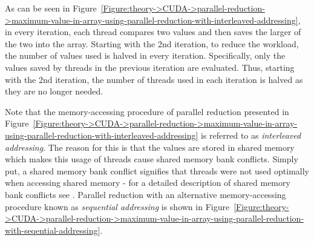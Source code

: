 As can be seen in Figure~\ref{Figure:theory->CUDA->parallel-reduction->maximum-value-in-array-using-parallel-reduction-with-interleaved-addressing}, in every iteration, each thread compares two values and then saves the larger of the two into the array.
Starting with the 2nd iteration, to reduce the workload, the number of values used is halved in every iteration.
Specifically, only the values saved by threads in the previous iteration are evaluated.
Thus, starting with the 2nd iteration, the number of threads used in each iteration is halved as they are no longer needed.

Note that the memory-accessing procedure of parallel reduction presented in Figure~\ref{Figure:theory->CUDA->parallel-reduction->maximum-value-in-array-using-parallel-reduction-with-interleaved-addressing} is referred to as \textit{interleaved addressing}.
The reason for this is that the values are stored in shared memory which makes this usage of threads cause shared memory bank conflicts.
Simply put, a shared memory bank conflict signifies that threads were not used optimally when accessing shared memory - for a detailed description of shared memory bank conflicts see  \cite{Cejka2022}.
Parallel reduction with an alternative memory-accessing procedure known as \textit{sequential addressing} is shown in Figure~\ref{Figure:theory->CUDA->parallel-reduction->maximum-value-in-array-using-parallel-reduction-with-seqential-addressing}.

